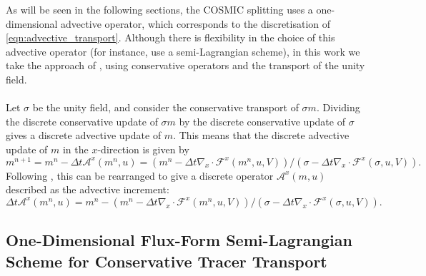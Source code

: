 \documentclass{ametsocV6.1}
\begin{document}
As will be seen in the following sections, the COSMIC splitting uses a one-dimensional advective operator, which corresponds to the discretisation of \eqref{eqn:advective_transport}.
Although there is flexibility in the choice of this advective operator (for instance, \citet{lin1996ffsl} use a semi-Lagrangian scheme), in this work we take the approach of \citet{putman2007fvtransport}, using conservative operators and the transport of the unity field. \\
\\
Let $\sigma$ be the unity field, and consider the conservative transport of $\sigma m$.
Dividing the discrete conservative update of $\sigma m$ by the discrete conservative update of $\sigma$ gives a discrete advective update of $m$.
This means that the discrete advective update of $m$ in the $x$-direction is given by
\begin{equation} \label{eqn:one_d_advection_tracer_2}
m^{n+1} = m^{n} - \Delta{t} \mathcal{A}^x(m^n,u) = \left( m^n - \Delta{t} \nabla_x\cdot \mathcal{F}^x(m^n,u,V)\right)/\left( \sigma - \Delta{t} \nabla_x\cdot \mathcal{F}^x(\sigma,u,V)\right).
\end{equation}
Following \citet{putman2007fvtransport}, this can be rearranged to give a discrete operator $\mathcal{A}^x(m,u)$ described as the advective increment:
\begin{equation}
    \Delta{t} \mathcal{A}^x(m^n, u) = m^n - \left( m^n - \Delta{t} \nabla_x\cdot \mathcal{F}^x(m^n,u,V)\right)/\left( \sigma - \Delta{t} \nabla_x\cdot \mathcal{F}^x(\sigma,u,V)\right).
\end{equation}

\subsection{One-Dimensional Flux-Form Semi-Lagrangian Scheme for Conservative Tracer Transport} \label{sec:consistent_ffsl_1d}
\end{document}
